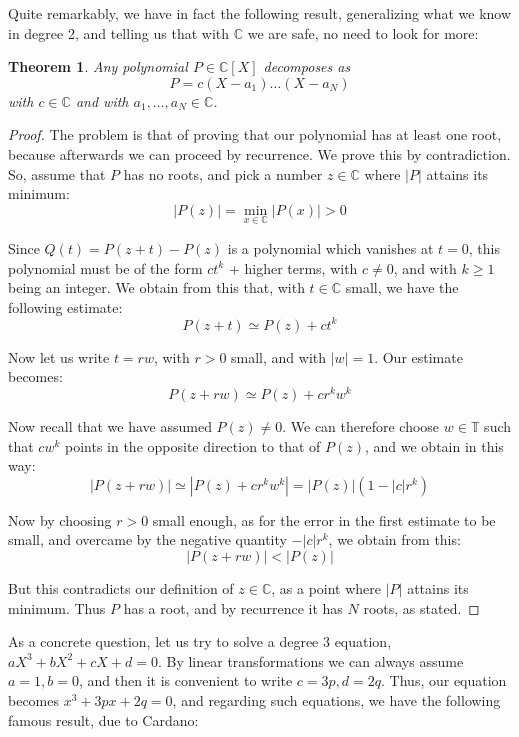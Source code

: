 \documentclass[12pt]{amsbook}
\newtheorem{theorem}{Theorem}[chapter]
\begin{document}
Quite remarkably, we have in fact the following result, generalizing what we know in degree 2, and telling us that with $\mathbb C$ we are safe, no need to look for more:

\begin{theorem}
Any polynomial $P\in\mathbb C[X]$ decomposes as
$$P=c(X-a_1)\ldots (X-a_N)$$
with $c\in\mathbb C$ and with $a_1,\ldots,a_N\in\mathbb C$.
\end{theorem}

\begin{proof}
The problem is that of proving that our polynomial has at least one root, because afterwards we can proceed by recurrence. We prove this by contradiction. So, assume that $P$ has no roots, and pick a number $z\in\mathbb C$ where $|P|$ attains its minimum:
$$|P(z)|=\min_{x\in\mathbb C}|P(x)|>0$$ 

Since $Q(t)=P(z+t)-P(z)$ is a polynomial which vanishes at $t=0$, this polynomial must be of the form $ct^k$ + higher terms, with $c\neq0$, and with $k\geq1$ being an integer. We obtain from this that, with $t\in\mathbb C$ small, we have the following estimate:
$$P(z+t)\simeq P(z)+ct^k$$

Now let us write $t=rw$, with $r>0$ small, and with $|w|=1$. Our estimate becomes:
$$P(z+rw)\simeq P(z)+cr^kw^k$$

Now recall that we have assumed $P(z)\neq0$. We can therefore choose $w\in\mathbb T$ such that $cw^k$ points in the opposite direction to that of $P(z)$, and we obtain in this way:
$$|P(z+rw)|
\simeq|P(z)+cr^kw^k|
=|P(z)|(1-|c|r^k)$$

Now by choosing $r>0$ small enough, as for the error in the first estimate to be small, and overcame by the negative quantity $-|c|r^k$, we obtain from this:
$$|P(z+rw)|<|P(z)|$$

But this contradicts our definition of $z\in\mathbb C$, as a point where $|P|$ attains its minimum. Thus $P$ has a root, and by recurrence it has $N$ roots, as stated.
\end{proof}

As a concrete question, let us try to solve a degree 3 equation, $aX^3+bX^2+cX+d=0$. By linear transformations we can always assume $a=1,b=0$, and then it is convenient to write $c=3p,d=2q$. Thus, our equation becomes $x^3+3px+2q=0$, and regarding such equations, we have the following famous result, due to Cardano:

\end{document}
